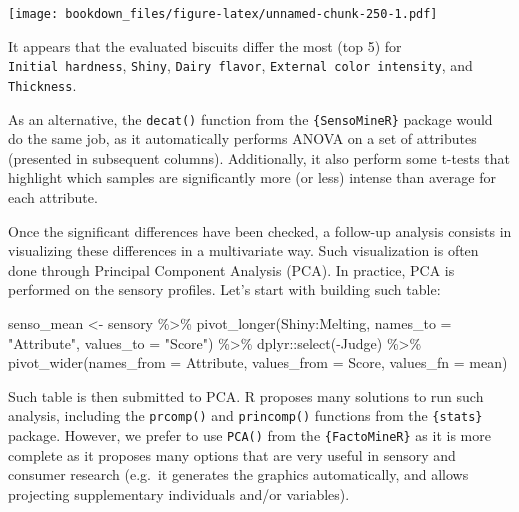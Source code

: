 \documentclass[
]{krantz}
\makeatletter
\newenvironment{Shaded}{\begin{snugshade}}{\end{snugshade}}
\newcommand{\AttributeTok}[1]{\textcolor[rgb]{0.61,0.61,0.61}{#1}}
\newcommand{\FunctionTok}[1]{\textcolor[rgb]{0,0,0}{#1}}
\newcommand{\NormalTok}[1]{#1}
\newcommand{\OtherTok}[1]{\textcolor[rgb]{0.37,0.37,0.37}{#1}}
\newcommand{\SpecialCharTok}[1]{\textcolor[rgb]{0,0,0}{#1}}
\newcommand{\StringTok}[1]{\textcolor[rgb]{0.5,0.5,0.5}{#1}}
\renewenvironment{quote}{\begin{VF}}{\end{VF}}
\newenvironment{kframe}{%
\medskip{}
\setlength{\fboxsep}{.8em}
 \def\at@end@of@kframe{}%
 \ifinner\ifhmode%
  \def\at@end@of@kframe{\end{minipage}}%
  \begin{minipage}{\columnwidth}%
 \fi\fi%
 \def\FrameCommand##1{\hskip\@totalleftmargin \hskip-\fboxsep
 \colorbox{shadecolor}{##1}\hskip-\fboxsep
     \hskip-\linewidth \hskip-\@totalleftmargin \hskip\columnwidth}%
 \MakeFramed {\advance\hsize-\width
   \@totalleftmargin\z@ \linewidth\hsize
   \@setminipage}}%
 {\par\unskip\endMakeFramed%
 \at@end@of@kframe}
\renewenvironment{Shaded}{\begin{kframe}}{\end{kframe}}
\makeatother
\begin{document}
\texttt{[image: bookdown\_files/figure-latex/unnamed-chunk-250-1.pdf]}

It appears that the evaluated biscuits differ the most (top 5) for \texttt{Initial\ hardness}, \texttt{Shiny}, \texttt{Dairy\ flavor}, \texttt{External\ color\ intensity}, and \texttt{Thickness}.

\begin{quote}
As an alternative, the \texttt{decat()} function from the \texttt{\{SensoMineR\}} package would do the same job, as it automatically performs ANOVA on a set of attributes (presented in subsequent columns). Additionally, it also perform some t-tests that highlight which samples are significantly more (or less) intense than average for each attribute.
\end{quote}

Once the significant differences have been checked, a follow-up analysis consists in visualizing these differences in a multivariate way. Such visualization is often done through Principal Component Analysis (PCA). In practice, PCA is performed on the sensory profiles. Let's start with building such table:

\begin{Shaded}
\begin{Highlighting}[]
\NormalTok{senso\_mean }\OtherTok{\textless{}{-}}\NormalTok{ sensory }\SpecialCharTok{\%\textgreater{}\%}
  \FunctionTok{pivot\_longer}\NormalTok{(Shiny}\SpecialCharTok{:}\NormalTok{Melting, }\AttributeTok{names\_to =} \StringTok{"Attribute"}\NormalTok{, }\AttributeTok{values\_to =} \StringTok{"Score"}\NormalTok{) }\SpecialCharTok{\%\textgreater{}\%}
\NormalTok{  dplyr}\SpecialCharTok{::}\FunctionTok{select}\NormalTok{(}\SpecialCharTok{{-}}\NormalTok{Judge) }\SpecialCharTok{\%\textgreater{}\%}
  \FunctionTok{pivot\_wider}\NormalTok{(}\AttributeTok{names\_from =}\NormalTok{ Attribute, }\AttributeTok{values\_from =}\NormalTok{ Score, }\AttributeTok{values\_fn =}\NormalTok{ mean)}
\end{Highlighting}
\end{Shaded}

Such table is then submitted to PCA. R proposes many solutions to run such analysis, including the \texttt{prcomp()} and \texttt{princomp()} functions from the \texttt{\{stats\}} package. However, we prefer to use \texttt{PCA()} from the \texttt{\{FactoMineR\}} as it is more complete as it proposes many options that are very useful in sensory and consumer research (e.g.~it generates the graphics automatically, and allows projecting supplementary individuals and/or variables).
\end{document}
